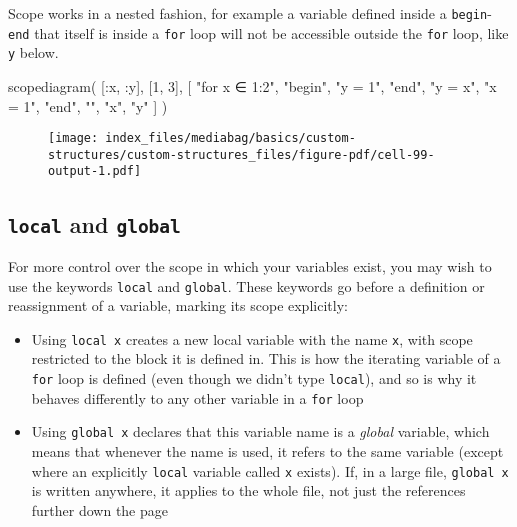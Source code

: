 \documentclass[
  letterpaper,
  DIV=11,
  numbers=noendperiod]{scrreprt}
\newenvironment{Shaded}{\begin{snugshade}}{\end{snugshade}}
\newcommand{\FloatTok}[1]{\textcolor[rgb]{0.68,0.00,0.00}{#1}}
\newcommand{\FunctionTok}[1]{\textcolor[rgb]{0.28,0.35,0.67}{#1}}
\newcommand{\NormalTok}[1]{\textcolor[rgb]{0.00,0.23,0.31}{#1}}
\newcommand{\OperatorTok}[1]{\textcolor[rgb]{0.37,0.37,0.37}{#1}}
\newcommand{\StringTok}[1]{\textcolor[rgb]{0.13,0.47,0.30}{#1}}
\begin{document}
Scope works in a nested fashion, for example a variable defined inside a
\texttt{begin}-\texttt{end} that itself is inside a \texttt{for} loop
will not be accessible outside the \texttt{for} loop, like \texttt{y}
below.

\begin{Shaded}
\begin{Highlighting}[]
\FunctionTok{scopediagram}\NormalTok{(}
\NormalTok{    [}\OperatorTok{:}\NormalTok{x, }\OperatorTok{:}\NormalTok{y], [}\FloatTok{1}\NormalTok{, }\FloatTok{3}\NormalTok{],}
\NormalTok{    [}
        \StringTok{"for x ∈ 1:2"}\NormalTok{,}
        \StringTok{"begin"}\NormalTok{,}
        \StringTok{"y = 1"}\NormalTok{,}
        \StringTok{"end"}\NormalTok{,}
        \StringTok{"y = x"}\NormalTok{,}
        \StringTok{"x = 1"}\NormalTok{,}
        \StringTok{"end"}\NormalTok{,}
        \StringTok{""}\NormalTok{,}
        \StringTok{"x"}\NormalTok{,}
        \StringTok{"y"}
\NormalTok{    ]}
\NormalTok{)}
\end{Highlighting}
\end{Shaded}

\begin{figure}[H]

{\centering \texttt{[image: index\_files/mediabag/basics/custom-structures/custom-structures\_files/figure-pdf/cell-99-output-1.pdf]}

}

\end{figure}

\hypertarget{local-and-global}{%
\subsection{\texorpdfstring{\texttt{local} and
\texttt{global}}{local and global}}\label{local-and-global}}

For more control over the scope in which your variables exist, you may
wish to use the keywords \texttt{local} and \texttt{global}. These
keywords go before a definition or reassignment of a variable, marking
its scope explicitly:

\begin{itemize}
\item
  Using \texttt{local\ x} creates a new local variable with the name
  \texttt{x}, with scope restricted to the block it is defined in. This
  is how the iterating variable of a \texttt{for} loop is defined (even
  though we didn't type \texttt{local}), and so is why it behaves
  differently to any other variable in a \texttt{for} loop
\item
  Using \texttt{global\ x} declares that this variable name is a
  \emph{global} variable, which means that whenever the name is used, it
  refers to the same variable (except where an explicitly \texttt{local}
  variable called \texttt{x} exists). If, in a large file,
  \texttt{global\ x} is written anywhere, it applies to the whole file,
  not just the references further down the page
\end{itemize}
\end{document}
